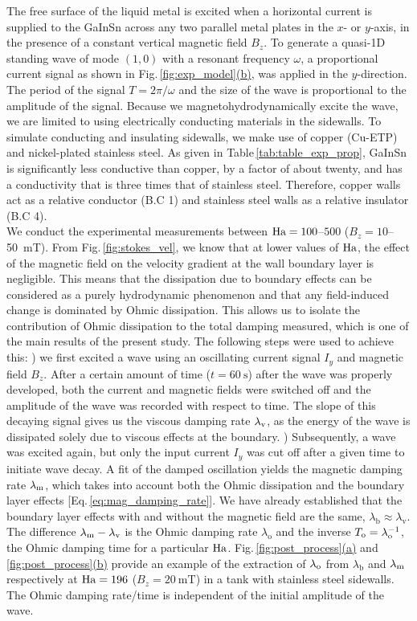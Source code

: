\documentclass[aps,prfluids,reprint,superscriptaddress]{revtex4-2}
\newcommand{\ii}[1]{\text{#1}}
\newcommand{\Rn}[1]{%
	\textup{\expandafter{\romannumeral#1}}%
}
\newcommand{\subref}[2]{\ref{#1}\hyperref[#1]{(#2)}}
\begin{document}
The free surface of the liquid metal is excited when a horizontal current is supplied to the GaInSn across any two parallel metal plates in the $x$- or $y$-axis, in the presence of a constant vertical magnetic field $B_z$. To generate a quasi-1D standing wave of mode $(1,0)$ with a resonant frequency $\omega$, a proportional current signal as shown in Fig.\,\subref{fig:exp_model}{b}, was applied in the $y$-direction. The period of the signal $T=2\pi/\omega$ and the size of the wave is proportional to the amplitude of the signal. Because we magnetohydrodynamically excite the wave, we are limited to using electrically conducting materials in the sidewalls. To simulate conducting and insulating sidewalls, we make use of copper (Cu-ETP) and nickel-plated stainless steel. As given in Table\,\ref{tab:table_exp_prop}, GaInSn is significantly less conductive than copper, by a factor of about twenty, and has a conductivity that is three times that of stainless steel. Therefore, copper walls act as a relative conductor (B.C 1) and stainless steel walls as a relative insulator (B.C 4). 
\\
\indent We conduct the experimental measurements between $\rm Ha=100$--$500$ ($B_z=10$--\SI{50}{\milli\tesla}). From Fig.\,\ref{fig:stokes_vel}, we know that at lower values of $\rm Ha$, the effect of the magnetic field on the velocity gradient at the wall boundary layer is negligible. This means that the dissipation due to boundary effects can be considered as a purely hydrodynamic phenomenon and that any field-induced change is dominated by Ohmic dissipation. This allows us to isolate the contribution of Ohmic dissipation to the total damping measured, which is one of the main results of the present study. The following steps were used to achieve this: \Rn{1}) we first excited a wave using an oscillating current signal $I_y$ and magnetic field $B_z$. After a certain amount of time ($t=\SI{60}{\second}$) after the wave was properly developed, both the current and magnetic fields were switched off and the amplitude of the wave was recorded with respect to time. The slope of this decaying signal gives us the viscous damping rate $\lambda_{\rm v}$, as the energy of the wave is dissipated solely due to viscous effects at the boundary. \Rn{2}) Subsequently, a wave was excited again, but only the input current $I_y$ was cut off after a given time to initiate wave decay. A fit of the damped oscillation yields the magnetic damping rate $\lambda_{\rm m}$, which takes into account both the Ohmic dissipation and the boundary layer effects [Eq.\,\eqref{eq:mag_damping_rate}]. We have already established that the boundary layer effects with and without the magnetic field are the same, $\lambda_{\ii b}\approx\lambda_{\ii v}$. The difference $\lambda_{\rm m} - \lambda_{\rm v}$ is the Ohmic damping rate $\lambda_{\ii o}$ and the inverse $T_{\rm o}=\lambda_{\ii o}^{-1}$, the Ohmic damping time for a particular $\rm Ha$. Fig.\,\subref{fig:post_process}{a} and \subref{fig:post_process}{b} provide an example of the extraction of $\lambda_{\rm o}$ from $\lambda_{\ii b}$ and $\lambda_{\rm m}$ respectively at $\rm Ha=196$ ($B_z=\SI{20}{\milli\tesla}$) in a tank with stainless steel sidewalls. The Ohmic damping rate/time is independent of the initial amplitude of the wave.
\end{document}
